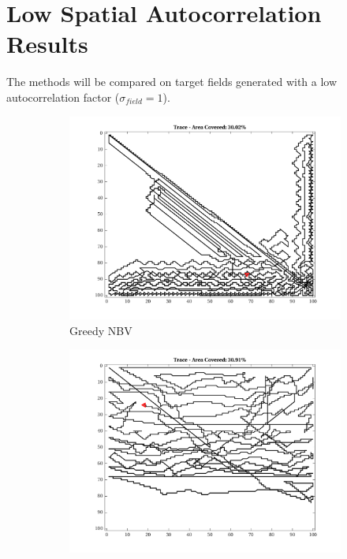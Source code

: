 \FloatBarrier
\clearpage
\section{Low Spatial Autocorrelation Results}
The methods will be compared on target fields generated with a low autocorrelation factor ($\sigma_{field}=1$).

\begin{figure}[htb!]
    \centering
    \begin{subfigure}[t]{0.25\textwidth}
        \centering
        \includegraphics[width=\linewidth]{figures/path_greedy_30p_100x100_sf_1_seed_1.png}
        \captionsetup{skip=0.20\baselineskip,size=footnotesize}
        \caption{Greedy NBV}
    \end{subfigure}%
    \begin{subfigure}[t]{0.25\textwidth}
        \centering
        \includegraphics[width=\linewidth]{figures/path_mc_30p_100x100_sf_1_seed_1.png}

\end{subfigure}
\end{figure}
